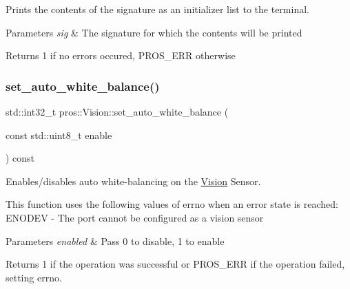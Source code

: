 Prints the contents of the signature as an initializer list to the terminal. 


\begin{DoxyParams}{Parameters}
{\em sig} & The signature for which the contents will be printed\\
\hline
\end{DoxyParams}
\begin{DoxyReturn}{Returns}
1 if no errors occured, P\+R\+O\+S\+\_\+\+E\+RR otherwise 
\end{DoxyReturn}
\mbox{\label{classpros_1_1Vision_a19cf2d7cf34b763b80da2c6511a61a49}} 
\subsubsection{\texorpdfstring{set\+\_\+auto\+\_\+white\+\_\+balance()}{set\_auto\_white\_balance()}}
{\footnotesize\ttfamily std\+::int32\+\_\+t pros\+::\+Vision\+::set\+\_\+auto\+\_\+white\+\_\+balance (\begin{DoxyParamCaption}\item[{const std\+::uint8\+\_\+t}]{enable }\end{DoxyParamCaption}) const}



Enables/disables auto white-\/balancing on the \hyperlink{classpros_1_1Vision}{Vision} Sensor. 

This function uses the following values of errno when an error state is reached\+: E\+N\+O\+D\+EV -\/ The port cannot be configured as a vision sensor


\begin{DoxyParams}{Parameters}
{\em enabled} & Pass 0 to disable, 1 to enable\\
\hline
\end{DoxyParams}
\begin{DoxyReturn}{Returns}
1 if the operation was successful or P\+R\+O\+S\+\_\+\+E\+RR if the operation failed, setting errno. 
\end{DoxyReturn}
\mbox{\label{classpros_1_1Vision_a2ad6faaad1abb936f52022022611ac7f}} 

